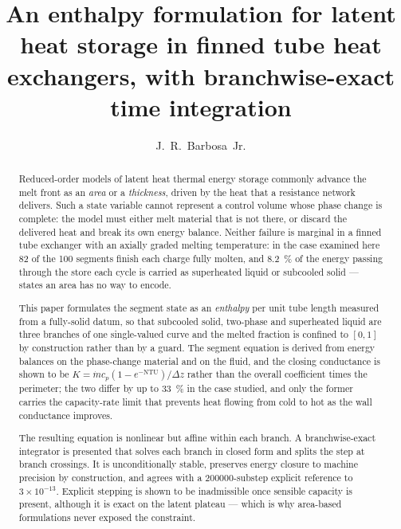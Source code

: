 \documentclass[preprint,12pt]{elsarticle}
\newcommand{\md}{\ensuremath{\dot m}}
\begin{document}
\begin{frontmatter}

\title{An enthalpy formulation for latent heat storage in finned tube
heat exchangers, with branchwise-exact time integration}

\author[lsu]{J.~R.~Barbosa~Jr.}

\address[lsu]{Craft \& Hawkins Department of Petroleum Engineering,
Louisiana State University, Baton Rouge, LA, USA}

\begin{abstract}
Reduced-order models of latent heat thermal energy storage commonly advance the
melt front as an \emph{area} or a \emph{thickness}, driven by the heat that a
resistance network delivers. Such a state variable cannot represent a control
volume whose phase change is complete: the model must either melt material that
is not there, or discard the delivered heat and break its own energy balance.
Neither failure is marginal in a finned tube exchanger with an axially graded
melting temperature: in the case examined here \num{82} of the \num{100}
segments finish each charge fully molten, and \SI{8.2}{\percent} of the energy
passing through the store each cycle is carried as superheated liquid or
subcooled solid --- states an area has no way to encode.

This paper formulates the segment state as an \emph{enthalpy} per unit tube
length measured from a fully-solid datum, so that subcooled solid, two-phase and
superheated liquid are three branches of one single-valued curve and the melted
fraction is confined to $[0,1]$ by construction rather than by a guard. The
segment equation is derived from energy balances on the phase-change material
and on the fluid, and the closing conductance is shown to be
$K=\md c_{p}(1-e^{-\mathrm{NTU}})/\Delta z$ rather than the overall coefficient
times the perimeter; the two differ by up to \SI{33}{\percent} in the case
studied, and only the former carries the capacity-rate limit that prevents heat
flowing from cold to hot as the wall conductance improves.

The resulting equation is nonlinear but affine within each branch. A
branchwise-exact integrator is presented that solves each branch in closed form
and splits the step at branch crossings. It is unconditionally stable, preserves
energy closure to machine precision by construction, and agrees with a
\num{200000}-substep explicit reference to $3\times10^{-13}$. Explicit stepping
is shown to be inadmissible once sensible capacity is present, although it is
exact on the latent plateau --- which is why area-based formulations never
exposed the constraint.


\end{abstract}
\end{frontmatter}
\end{document}
